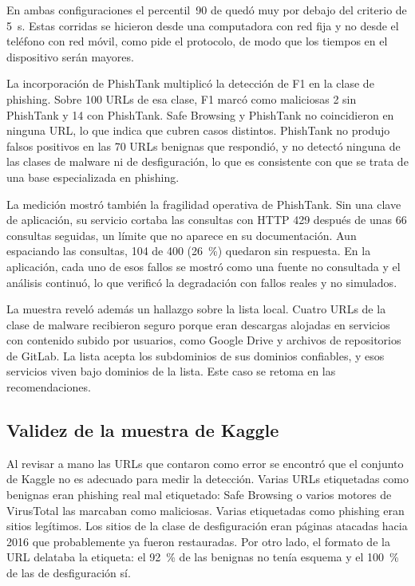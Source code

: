 En ambas configuraciones el percentil~90 de \tfuno{} quedó muy por debajo del criterio de 5~s. Estas corridas se hicieron desde una computadora con red fija y no desde el teléfono con red móvil, como pide el protocolo, de modo que los tiempos en el dispositivo serán mayores.


La incorporación de PhishTank multiplicó la detección de F1 en la clase de phishing. Sobre 100 URLs de esa clase, F1 marcó como maliciosas 2 sin PhishTank y 14 con PhishTank. Safe Browsing y PhishTank no coincidieron en ninguna URL, lo que indica que cubren casos distintos. PhishTank no produjo falsos positivos en las 70 URLs benignas que respondió, y no detectó ninguna de las clases de malware ni de desfiguración, lo que es consistente con que se trata de una base especializada en phishing.

La medición mostró también la fragilidad operativa de PhishTank. Sin una clave de aplicación, su servicio cortaba las consultas con HTTP 429 después de unas 66 consultas seguidas, un límite que no aparece en su documentación. Aun espaciando las consultas, 104 de 400 (26~\%) quedaron sin respuesta. En la aplicación, cada uno de esos fallos se mostró como una fuente no consultada y el análisis continuó, lo que verificó la degradación con fallos reales y no simulados.

La muestra reveló además un hallazgo sobre la lista local. Cuatro URLs de la clase de malware recibieron seguro porque eran descargas alojadas en servicios con contenido subido por usuarios, como Google Drive y archivos de repositorios de GitLab. La lista acepta los subdominios de sus dominios confiables, y esos servicios viven bajo dominios de la lista. Este caso se retoma en las recomendaciones.

\subsection{Validez de la muestra de Kaggle}

Al revisar a mano las URLs que contaron como error se encontró que el conjunto de Kaggle no es adecuado para medir la detección. Varias URLs etiquetadas como benignas eran phishing real mal etiquetado: Safe Browsing o varios motores de VirusTotal las marcaban como maliciosas. Varias etiquetadas como phishing eran sitios legítimos. Los sitios de la clase de desfiguración eran páginas atacadas hacia 2016 que probablemente ya fueron restauradas. Por otro lado, el formato de la URL delataba la etiqueta: el 92~\% de las benignas no tenía esquema y el 100~\% de las de desfiguración sí.

